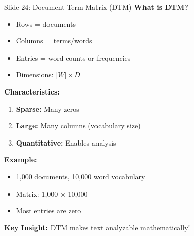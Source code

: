 \documentclass[8pt]{beamer}
\begin{document}
	\begin{frame}{Slide 24: Document Term Matrix (DTM)}
		\fontsize{6.5}{7.5}\selectfont
		\textbf{What is DTM?}
		\begin{itemize}
			\item Rows = documents
			\item Columns = terms/words
			\item Entries = word counts or frequencies
			\item Dimensions: $|W| \times D$
		\end{itemize}
		
		\vspace{0.1cm}
		\textbf{Characteristics:}
		\begin{enumerate}
			\item \textbf{Sparse:} Many zeros
			\item \textbf{Large:} Many columns (vocabulary size)
			\item \textbf{Quantitative:} Enables analysis
		\end{enumerate}
		
		\vspace{0.1cm}
		\textbf{Example:}
		\begin{itemize}
			\item 1,000 documents, 10,000 word vocabulary
			\item Matrix: 1,000 $\times$ 10,000
			\item Most entries are zero
		\end{itemize}
		
		\textcolor{myblue}{\textbf{Key Insight:}} DTM makes text analyzable mathematically!
	\end{frame}
	
\end{document}

